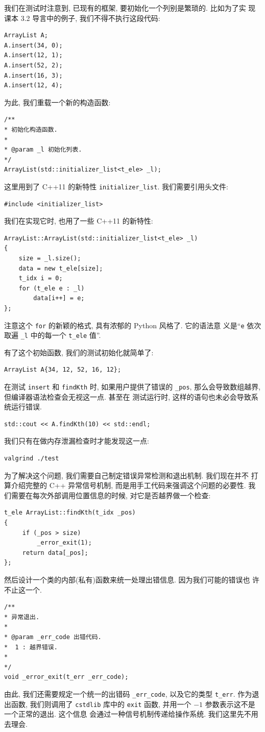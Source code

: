 \documentclass[a4paper]{ctexart}
\theoremstyle{definition}
\theoremstyle{definition}
\begin{document}
我们在测试时注意到, 已现有的框架, 要初始化一个列别是繁琐的. 比如为了实
现课本 3.2 导言中的例子, 我们不得不执行这段代码:

\begin{verbatim}
ArrayList A;
A.insert(34, 0);
A.insert(12, 1);
A.insert(52, 2);
A.insert(16, 3);
A.insert(12, 4);
\end{verbatim}

为此, 我们重载一个新的构造函数:

\begin{verbatim}
/** 
* 初始化构造函数.
* 
* @param _l 初始化列表.
*/
ArrayList(std::initializer_list<t_ele> _l);
\end{verbatim}
这里用到了 C++11 的新特性 \verb|initializer_list|. 我们需要引用头文件:
\begin{verbatim}
#include <initializer_list>
\end{verbatim}
我们在实现它时, 也用了一些 C++11 的新特性:
\begin{verbatim}
ArrayList::ArrayList(std::initializer_list<t_ele> _l)
{
	size = _l.size();
	data = new t_ele[size];
	t_idx i = 0;
	for (t_ele e : _l)
		data[i++] = e;
};
\end{verbatim}
注意这个 \verb|for| 的新颖的格式, 具有浓郁的 Python 风格了. 它的语法意
义是``\verb|e| 依次取遍 \verb|_l| 中的每一个 \verb|t_ele| 值''.

有了这个初始函数, 我们的测试初始化就简单了:
\begin{verbatim}
ArrayList A{34, 12, 52, 16, 12};
\end{verbatim}

在测试 \verb|insert| 和 \verb|findKth| 时, 如果用户提供了错误的
\verb|_pos|, 那么会导致数组越界, 但编译器语法检查会无视这一点. 甚至在
测试运行时, 这样的语句也未必会导致系统运行错误.
\begin{verbatim}
std::cout << A.findKth(10) << std::endl;
\end{verbatim}
我们只有在做内存泄漏检查时才能发现这一点:
\begin{verbatim}
valgrind ./test
\end{verbatim}
为了解决这个问题, 我们需要自己制定错误异常检测和退出机制. 我们现在并不
打算介绍完整的 C++ 异常信号机制, 而是用手工代码来强调这个问题的必要性.
我们需要在每次外部调用位置信息的时候, 对它是否越界做一个检查: 
\begin{verbatim}
t_ele ArrayList::findKth(t_idx _pos) 
{
     if (_pos > size)
         _error_exit(1);
     return data[_pos];
};
\end{verbatim}
然后设计一个类的内部(私有)函数来统一处理出错信息. 因为我们可能的错误也
许不止这一个.
\begin{verbatim}
/** 
* 异常退出.
* 
* @param _err_code 出错代码.
*  1 : 越界错误.
* 
*/
void _error_exit(t_err _err_code);
\end{verbatim}
由此, 我们还需要规定一个统一的出错码 \verb|_err_code|, 以及它的类型
\verb|t_err|. 作为退出函数, 我们则调用了 \verb|cstdlib| 库中的
\verb|exit| 函数, 并用一个 $-1$ 参数表示这不是一个正常的退出. 这个信息
会通过一种信号机制传递给操作系统. 我们这里先不用去理会.
\end{document}
